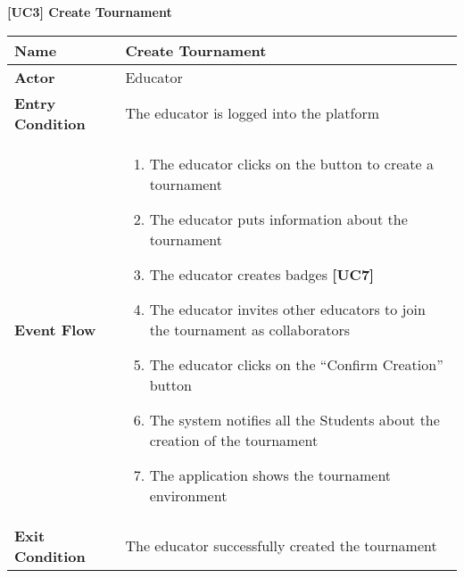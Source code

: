 \documentclass{article}
\begin{document}
\begin{table}
 \renewcommand{\arraystretch}{1.5}
    \centering
    \raggedright\textbf{[UC3] Create Tournament}
    \begin{tabular}{|l|p{10cm}|}
        \hline
        \textbf{Name} & Create Tournament \\
        \hline
        \textbf{Actor} & Educator \\
        \hline
        \textbf{Entry Condition} & The educator is logged into the platform \\
        \hline
        \textbf{Event Flow} & 
        \begin{enumerate}[align=left, topsep=0pt, partopsep=0pt]
            \item The educator clicks on the button to create a tournament
            \item The educator puts information about the tournament 
            \item The educator creates badges \textbf{[UC7]}
            \item The educator invites other educators to join the tournament as collaborators
            \item The educator clicks on the “Confirm Creation” button
            \item The system notifies all the Students about the creation of the tournament
            \item The application shows the tournament environment 
        \end{enumerate} \\
        \hline
        \textbf{Exit Condition} & The educator successfully created the tournament  \\
        \hline
    \end{tabular}
\end{table}
\end{document}
